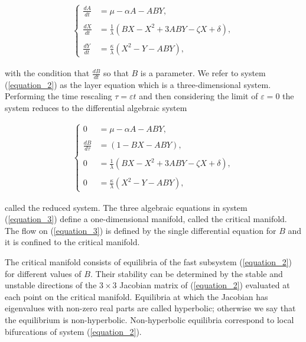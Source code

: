 \documentclass{ws-ijbc}
\begin{document}
\begin{equation}
\begin{aligned}
\begin{cases}
\frac{dA}{dt} &= \mu - \alpha A - ABY, \\ \\
\frac{dX}{dt} &= \frac{1}{\lambda}(BX - X^2 +3ABY - \zeta X + \delta), \\ \\
\frac{dY}{dt} &= \frac{\kappa}{\lambda}(X^2 - Y - ABY),
\end{cases}
\end{aligned}
\label{equation_2}
\end{equation}
    
\noindent
with the condition that $\frac{dB}{dt}$ so that $B$ is a parameter.  We refer to system (\ref{equation_2}) as the layer equation which is a three-dimensional system.  Performing the time rescaling $\tau = \varepsilon t$ and then considering the limit of $\varepsilon = 0$ the system reduces to the differential algebraic system
    
 \begin{equation}
\begin{aligned}
\begin{cases}
0 &= \mu - \alpha A - ABY, \\ \\
\frac{dB}{d\tau} &= (1-BX - ABY), \\ \\
0 &= \frac{1}{\lambda}(BX - X^2 +3ABY - \zeta X + \delta), \\ \\
0 &= \frac{\kappa}{\lambda}(X^2 - Y - ABY),
\end{cases}
\end{aligned}
\label{equation_3}
\end{equation}
    
\noindent
called the reduced system. The three algebraic equations in system (\ref{equation_3}) define a one-dimensional manifold, called the critical manifold.  The flow on (\ref{equation_3}) is defined by the single differential equation for $B$ and it is confined to the critical manifold.  

The critical manifold consists of equilibria of the fast subsystem (\ref{equation_2}) for different values of $B$.  Their stability can be determined by the stable and unstable directions of the $3\times3$ Jacobian matrix of (\ref{equation_2}) evaluated at each point on the critical manifold.  Equilibria at which the Jacobian has eigenvalues with non-zero real parts are called hyperbolic; otherwise we say that the equilibrium is non-hyperbolic.  Non-hyperbolic equilibria correspond to local bifurcations of system (\ref{equation_2}).
\end{document}
